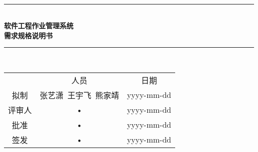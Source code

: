 \documentclass[bachelor]{ustcthesis}
\newcommand{\docname}{软件工程作业管理系统}
\newcommand{\HRule}{\rule{\linewidth}{0.5mm}}
\begin{document}
\begin{titlepage}
\begin{center}
~\\[5cm]
\HRule \\[0.4cm]
{\huge \bfseries \docname\\需求规格说明书}\\[0.4cm]
\HRule \\[1.5cm]

\begin{tabular}{ccc}
  & 人员 & 日期 \\ 
拟制 & 张艺潇\ 王宇飞\ 熊家靖 & yyyy-mm-dd \\ 
评审人 & • & yyyy-mm-dd \\ 
批准 & • & yyyy-mm-dd \\ 
签发 & • & yyyy-mm-dd \\ 
\end{tabular} 

\end{center}
\end{titlepage}



\frontmatter

\tableofcontents
\listoffigures
\listoftables
% 

\mainmatter












\appendix


\end{document}
